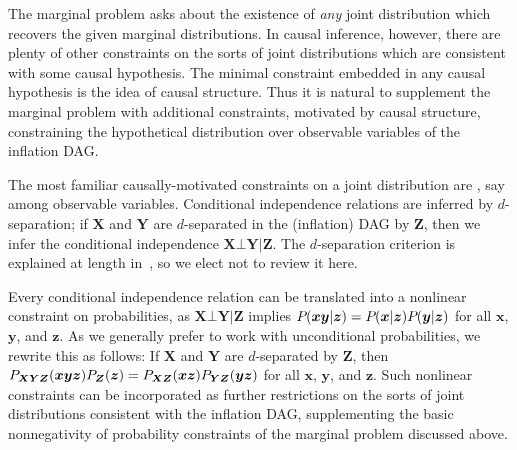 
The marginal problem asks about the existence of \emph{any} joint distribution which recovers the given marginal distributions. In causal inference, however, there are plenty of other constraints on the sorts of joint distributions which are consistent with some causal hypothesis. The minimal constraint embedded in any causal hypothesis is the idea of causal structure. Thus it is natural to supplement the marginal problem with additional constraints, motivated by causal structure, constraining the hypothetical distribution over observable variables of the inflation DAG.

The most familiar causally-motivated constraints on a joint distribution are , say among observable variables. Conditional independence relations are inferred by $d$-separation; if $\bm{X}$ and $\bm{Y}$ are $d$-separated in the (inflation) DAG by $\bm{Z}$, then we infer the conditional independence $\bm{X}\bot\bm{Y}|\bm{Z}$. The $d$-separation criterion is explained at length in~\cite{pearl2009causality,studeny2005probabilistic,WoodSpekkens,pusey2014gdag}, so we elect not to review it here.

Every conditional independence relation can be translated into a nonlinear constraint on probabilities, as $\bm{X}\bot\bm{Y}|\bm{Z}$ implies $\p{\bm{x}\bm{y}|\bm{z}}=\p{\bm{x}|\bm{z}}\p{\bm{y}|\bm{z}}$ for all $\bm{x}$, $\bm{y}$, and $\bm{z}$. As we generally prefer to work with unconditional probabilities, we rewrite this as follows: If $\bm{X}$ and $\bm{Y}$ are $d$-separated by $\bm{Z}$, then $\p[\bm{X}\bm{Y}\bm{Z}]{\bm{x}\bm{y}\bm{z}}\p[\bm{Z}]{\bm{z}}=\p[\bm{X}\bm{Z}]{\bm{x}\bm{z}}\p[\bm{Y}\bm{Z}]{\bm{y}\bm{z}}$ for all $\bm{x}$, $\bm{y}$, and $\bm{z}$. Such nonlinear constraints can be incorporated as further restrictions on the sorts of joint distributions consistent with the inflation DAG, supplementing the basic nonnegativity of probability constraints of the marginal problem discussed above.


